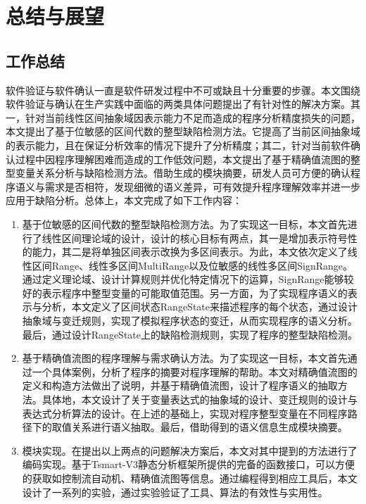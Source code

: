 
\chapter{总结与展望}

\section{工作总结}

软件验证与软件确认一直是软件研发过程中不可或缺且十分重要的步骤。本文围绕软件验证与确认在生产实践中面临的两类具体问题提出了有针对性的解决方案。其一，针对当前线性区间抽象域因表示能力不足而造成的程序分析精度损失的问题，本文提出了基于位敏感的区间代数的整型缺陷检测方法。它提高了当前区间抽象域的表示能力，且在保证分析效率的情况下提升了分析精度；其二，针对当前软件确认过程中因程序理解困难而造成的工作低效问题，本文提出了基于精确值流图的整型变量关系分析与缺陷检测方法。借助生成的模块摘要，研发人员可方便的确认程序语义与需求是否相符，发现细微的语义差异，可有效提升程序理解效率并进一步应用于缺陷分析。总体上，本文完成了如下工作内容：

\begin{enumerate}
	\item 基于位敏感的区间代数的整型缺陷检测方法。为了实现这一目标，本文首先进行了线性区间理论域的设计，设计的核心目标有两点，其一是增加表示符号性的能力，其二是将单独区间表示改换为多区间表示。为此，本文依次定义了线性区间Range、线性多区间MultiRange以及位敏感的线性多区间SignRange。通过定义理论域、设计计算规则并优化特定情况下的运算，SignRange能够较好的表示程序中整型变量的可能取值范围。另一方面，为了实现程序语义的表示与分析，本文定义了区间状态RangeState来描述程序的每个状态，通过设计抽象域与变迁规则，实现了模拟程序状态的变迁，从而实现程序的语义分析。最后，通过设计RangeState上的缺陷检测规则，实现了程序的整型缺陷检测。
	
	\item 基于精确值流图的程序理解与需求确认方法。为了实现这一目标，本文首先通过一个具体案例，分析了程序的摘要对程序理解的帮助。本文对精确值流图的定义和构造方法做出了说明，并基于精确值流图，设计了程序语义的抽取方法。具体地，本文设计了关于变量表达式的抽象域的设计、变迁规则的设计与表达式分析算法的设计。在上述的基础上，实现对程序整型变量在不同程序路径下的取值关系进行语义抽取。最后，借助得到的语义信息生成模块摘要。
	
	\item 模块实现。在提出以上两点的问题解决方案后，本文对其中提到的方法进行了编码实现。基于Tsmart-V3静态分析框架所提供的完备的函数接口，可以方便的获取如控制流自动机、精确值流图等信息。通过编程得到相应工具后，本文设计了一系列的实验，通过实验验证了工具、算法的有效性与实用性。
\end{enumerate}

